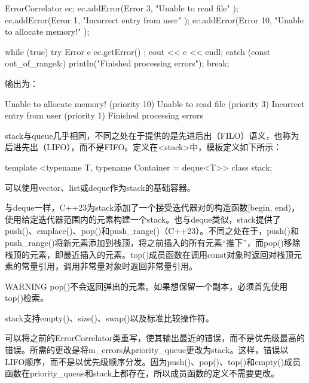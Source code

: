 \begin{cpp}
ErrorCorrelator ec;
ec.addError(Error { 3, "Unable to read file" });
ec.addError(Error { 1, "Incorrect entry from user" });
ec.addError(Error { 10, "Unable to allocate memory!" });

while (true) {
    try {
        Error e { ec.getError() };
        cout << e << endl;
    } catch (const out_of_range&) {
        println("Finished processing errors");
        break;
    }
}
\end{cpp}

输出为：

\begin{shell}
Unable to allocate memory! (priority 10)
Unable to read file (priority 3)
Incorrect entry from user (priority 1)
Finished processing errors
\end{shell}


stack与queue几乎相同，不同之处在于提供的是先进后出（FILO）语义，也称为后进先出（LIFO），而不是FIFO。定义在<stack>中，模板定义如下所示：

\begin{cpp}
template <typename T, typename Container = deque<T>> class stack;
\end{cpp}

可以使用vector、list或deque作为stack的基础容器。


与deque一样，C++23为stack添加了一个接受迭代器对的构造函数[begin, end)，使用给定迭代器范围内的元素构建一个stack。也与deque类似，stack提供了push()、emplace()、pop()和push\_range()（C++23）。不同之处在于，push()和push\_range()将新元素添加到栈顶，将之前插入的所有元素“推下”，而pop()移除栈顶的元素，即最近插入的元素。top()成员函数在调用const对象时返回对栈顶元素的常量引用，调用非常量对象时返回非常量引用。

\begin{myWarning}{WARNING}
pop()不会返回弹出的元素。如果想保留一个副本，必须首先使用top()检索。
\end{myWarning}

stack支持empty()、size()、swap()以及标准比较操作符。


可以将之前的ErrorCorrelator类重写，使其输出最近的错误，而不是优先级最高的错误。所需的更改是将m\_errors从priority\_queue更改为stack。这样，错误以LIFO顺序，而不是以优先级顺序分发。因为push()、pop()、top()和empty()成员函数在priority\_queue和stack上都存在，所以成员函数的定义不需要更改。











